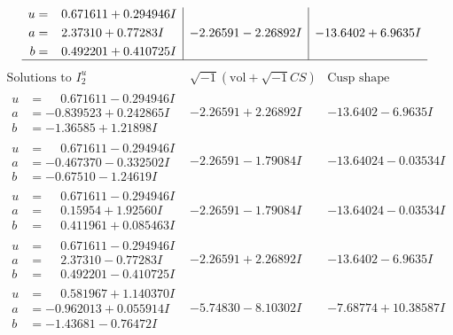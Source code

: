 \documentclass[1p]{elsarticle_modified}
\theoremstyle{definition}
\newcommand{\I}{\sqrt{-1}}
\begin{document}
$$\begin{array}{c|c|c}
\begin{aligned}
u &= \phantom{-}0.671611 + 0.294946 I \\
a &= \phantom{-}2.37310 + 0.77283 I \\
b &= \phantom{-}0.492201 + 0.410725 I\end{aligned}
 & -2.26591 - 2.26892 I & -13.6402 + 6.9635 I\\
 \hline 
 \end{array}$$\newpage$$\begin{array}{c|c|c}  
\text{Solutions to }I^u_{2}& \I (\text{vol} + \sqrt{-1}CS) & \text{Cusp shape}\\
 \hline 
\begin{aligned}
u &= \phantom{-}0.671611 - 0.294946 I \\
a &= -0.839523 + 0.242865 I \\
b &= -1.36585 + 1.21898 I\end{aligned}
 & -2.26591 + 2.26892 I & -13.6402 - 6.9635 I \\ \hline\begin{aligned}
u &= \phantom{-}0.671611 - 0.294946 I \\
a &= -0.467370 - 0.332502 I \\
b &= -0.67510 - 1.24619 I\end{aligned}
 & -2.26591 - 1.79084 I & -13.64024 - 0.03534 I \\ \hline\begin{aligned}
u &= \phantom{-}0.671611 - 0.294946 I \\
a &= \phantom{-}0.15954 + 1.92560 I \\
b &= \phantom{-}0.411961 + 0.085463 I\end{aligned}
 & -2.26591 - 1.79084 I & -13.64024 - 0.03534 I \\ \hline\begin{aligned}
u &= \phantom{-}0.671611 - 0.294946 I \\
a &= \phantom{-}2.37310 - 0.77283 I \\
b &= \phantom{-}0.492201 - 0.410725 I\end{aligned}
 & -2.26591 + 2.26892 I & -13.6402 - 6.9635 I \\ \hline\begin{aligned}
u &= \phantom{-}0.581967 + 1.140370 I \\
a &= -0.962013 + 0.055914 I \\
b &= -1.43681 - 0.76472 I\end{aligned}
 & -5.74830 - 8.10302 I & -7.68774 + 10.38587 I \\ \hline\begin{aligned}

\end{aligned}
\end{array}$$
\end{document}
